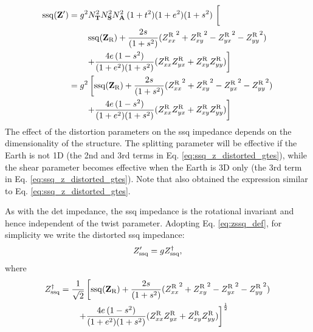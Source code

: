 	\begin{equation}\label{eq:ssq_z_distorted_gtes}
		\begin{split}
		\ssq(\ZbfDistorted) & = g^2\NT^2\NS^2\NA^2\, (1+\twistp^2) (1+\shearp^2) (1+\splittingp^2)\, \left[\phantom{\frac{1}{2}} \right. \\
		& \quad\quad \left. \ssq(\ZbfUndistorted)+\frac{2\splittingp}{(1+\splittingp^2)}  ({\ZxxR}^2+{\ZxyR}^2-{\ZyxR}^2-{\ZyyR}^2) \right.\\
		& \quad\quad \left. + \frac{4\shearp\,(1-\splittingp^2)}{(1+\shearp^2)(1+\splittingp^2)} ({\ZxxR}{\ZyxR}+{\ZxyR}{\ZyyR}) \right] \\
		& = g^2\left[ \ssq(\ZbfUndistorted)+\frac{2\splittingp}{(1+\splittingp^2)} ({\ZxxR}^2+{\ZxyR}^2-{\ZyxR}^2-{\ZyyR}^2) \right. \\
		& \quad\quad \left. + \frac{4\shearp\,(1-\splittingp^2)}{(1+\shearp^2)(1+\splittingp^2)} ({\ZxxR}{\ZyxR}+{\ZxyR}{\ZyyR})  \right]
		\end{split}
	\end{equation}
The effect of the distortion parameters on the ssq impedance depends on the dimensionality of the structure. The splitting parameter will be effective if the Earth is not 1D (the 2nd and 3rd terms in Eq. \ref{eq:ssq_z_distorted_gtes}), while the shear parameter becomes effective when the Earth is 3D only (the 3rd term in Eq. \ref{eq:ssq_z_distorted_gtes}).
	Note that \citet{gomez-trevino2013a} also obtained the expression similar to Eq. \eqref{eq:ssq_z_distorted_gtes}.
	
	As with the det impedance, the ssq impedance is the rotational invariant and hence independent of the twist parameter.
	Adopting Eq. \eqref{eq:zssq_def}, for simplicity we write the distorted ssq impedance:
	\begin{equation}\label{eq:zssq_distorted_gtes}
		\ZssqDistorted = \gain \ZssqDistortedExGain,
	\end{equation}
	where
	\begin{equation}\label{eq:zssq_distorted_gtes_exgain}
	\begin{split}
		\ZssqDistortedExGain & = \frac{1}{\sqrt{2}}\left[ \ssq(\ZbfUndistorted)+\frac{2\splittingp}{(1+\splittingp^2)} ({\ZxxR}^2+{\ZxyR}^2-{\ZyxR}^2-{\ZyyR}^2) \right. \\
		& \quad\quad \left. + \frac{4\shearp\,(1-\splittingp^2)}{(1+\shearp^2)(1+\splittingp^2)} (\ZxxR\ZyxR+\ZxyR\ZyyR)  \right]^\frac{1}{2}
	\end{split}
	\end{equation}

